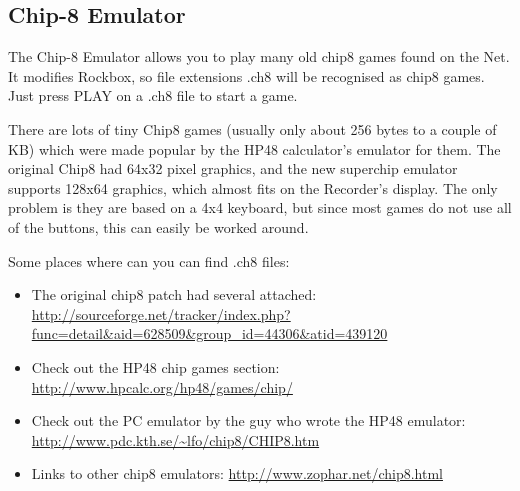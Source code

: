 \subsection{\label{ref:Chip8emulator}Chip{}-8 Emulator}
The Chip{}-8 Emulator allows you to play many old chip8 games found on
the Net. It modifies Rockbox, so file extensions .ch8 will be
recognised as chip8 games. Just press PLAY on a .ch8 file to start a
game.

There are lots of tiny Chip8 games (usually only about 256 bytes to a
couple of KB) which were made popular by the HP48
calculator's emulator for them. The original Chip8 had
64x32 pixel graphics, and the new superchip emulator supports 128x64
graphics, which almost fits on the Recorder's display.
The only problem is they are based on a 4x4 keyboard, but since most
games do not use all of the buttons, this can easily be worked around.

Some places where can you can find .ch8 files:

\begin{itemize}
\item The original chip8 patch had several attached:
\url{http://sourceforge.net/tracker/index.php?func=detail&aid=628509&group_id=44306&atid=439120}
\item Check out the HP48 chip games section:
\url{http://www.hpcalc.org/hp48/games/chip/}
\item Check out the PC emulator by the guy who wrote the HP48 emulator:
\url{http://www.pdc.kth.se/~lfo/chip8/CHIP8.htm}
\item Links to other chip8 emulators: 
\url{http://www.zophar.net/chip8.html}
\end{itemize}


